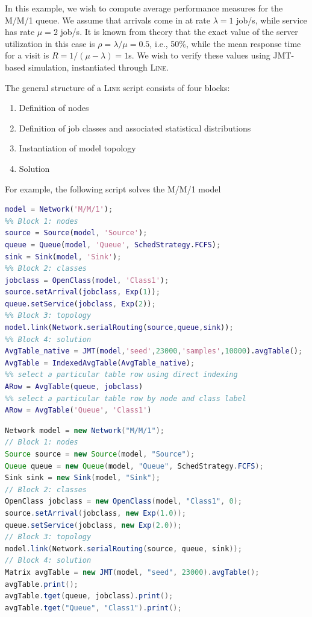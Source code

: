 In this example, we wish to compute average performance measures for the M/M/1 queue. We assume that arrivals come in at rate $\lambda=1$ job/s, while service has rate $\mu=2$ job/s. It is known from theory that the exact value of the server utilization in this case is $\rho=\lambda/\mu=0.5$, i.e., 50\%, while the mean response time for a visit is $R=1/(\mu-\lambda)=1$s. We wish to verify these values using JMT-based simulation, instantiated through \textsc{Line}.

The general structure of a \textsc{Line} script consists of four blocks:
\begin{enumerate}
\item Definition of nodes
\item Definition of job classes and associated statistical distributions
\item Instantiation of model topology
\item Solution
\end{enumerate}
For example, the following script solves the M/M/1 model
\begin{MATLAB}
\begin{lstlisting}[language = matlab]
model = Network('M/M/1');
%% Block 1: nodes
source = Source(model, 'Source');
queue = Queue(model, 'Queue', SchedStrategy.FCFS);
sink = Sink(model, 'Sink');
%% Block 2: classes
jobclass = OpenClass(model, 'Class1');
source.setArrival(jobclass, Exp(1));
queue.setService(jobclass, Exp(2));
%% Block 3: topology
model.link(Network.serialRouting(source,queue,sink));
%% Block 4: solution
AvgTable_native = JMT(model,'seed',23000,'samples',10000).avgTable();
AvgTable = IndexedAvgTable(AvgTable_native);
%% select a particular table row using direct indexing
ARow = AvgTable(queue, jobclass)
%% select a particular table row by node and class label
ARow = AvgTable('Queue', 'Class1')
\end{lstlisting}
\end{MATLAB}
\begin{JAVA}
\begin{lstlisting}[language = java, basicstyle=\ttfamily\scriptsize]
Network model = new Network("M/M/1");
// Block 1: nodes
Source source = new Source(model, "Source");
Queue queue = new Queue(model, "Queue", SchedStrategy.FCFS);
Sink sink = new Sink(model, "Sink");
// Block 2: classes
OpenClass jobclass = new OpenClass(model, "Class1", 0);
source.setArrival(jobclass, new Exp(1.0));
queue.setService(jobclass, new Exp(2.0));
// Block 3: topology
model.link(Network.serialRouting(source, queue, sink));
// Block 4: solution
Matrix avgTable = new JMT(model, "seed", 23000).avgTable();
avgTable.print();
avgTable.tget(queue, jobclass).print();
avgTable.tget("Queue", "Class1").print();
\end{lstlisting}
\end{JAVA}
